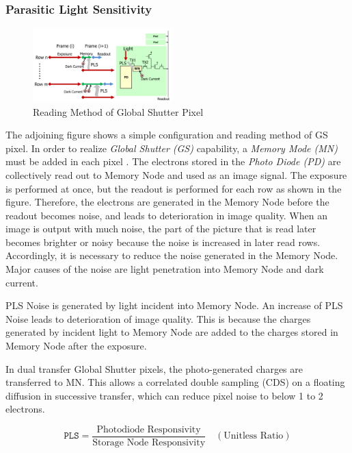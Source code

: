 \documentclass[../../main.tex]{subfiles}
\begin{document}
\newpage

\subsubsection{Parasitic Light Sensitivity} %
\begin{figure}
  \begin{center}
    \includegraphics[width=0.48\textwidth]{Figures/Model/CMOS_PLS.jpeg}
  \end{center}
  \label{fig:PLS}
  \caption{Reading Method of Global Shutter Pixel}
\end{figure}

The adjoining figure shows a simple configuration and reading method of GS pixel. In order to realize \emph{Global Shutter (GS)} capability, a \emph{Memory Mode (MN)} must be added in each pixel . The electrons stored in the \emph{Photo Diode (PD)} are collectively read out to Memory Node and used as an image signal. The exposure is performed at once, but the readout is performed for each row as shown in the figure. Therefore, the electrons are generated in the Memory Node before the readout becomes noise, and leads to deterioration in image quality. When an image is output with much noise, the part of the picture that is read later becomes brighter or noisy because the noise is increased in later read rows. Accordingly, it is necessary to reduce the noise generated in the Memory Node. Major causes of the noise are light penetration into Memory Node and dark current.

PLS Noise is generated by light incident into Memory Node. An increase of PLS Noise leads to deterioration of image quality. This is because the charges generated by incident light to Memory Node are added to the charges stored in Memory Node after the exposure.

In dual transfer Global Shutter pixels, the photo-generated charges are transferred to MN. This allows a correlated double sampling (CDS) on a floating diffusion in successive transfer, which can reduce pixel noise to below 1 to 2 electrons.

\begin{equation*}
    \texttt{PLS} = \frac{\text{Photodiode Responsivity}}{\text{Storage Node Responsivity}} \quad (\text{Unitless Ratio})
\end{equation*}
\end{document}
